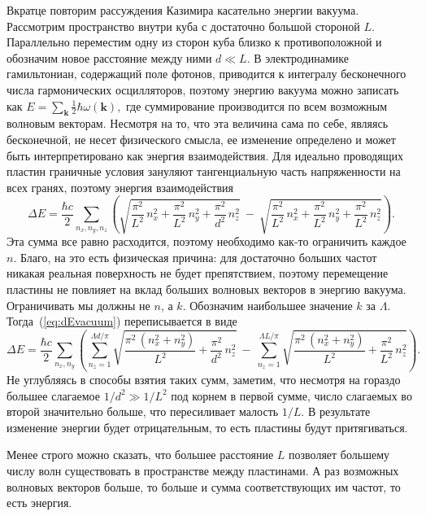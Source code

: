 \documentclass[a4paper, 12pt]{article}
\def\vec#1{\mathbf{#1}}
\begin{document}
Вкратце повторим рассуждения Казимира касательно энергии вакуума. Рассмотрим пространство внутри куба с достаточно большой стороной $L$. Параллельно переместим одну из сторон куба близко к противоположной и обозначим новое расстояние между ними $d\ll L$. 
В электродинамике гамильтониан, содержащий поле фотонов, приводится к интегралу бесконечного числа гармонических осцилляторов, поэтому энергию вакуума можно записать как 
$E = \sum\limits_\vec{k} \frac{1}{2} \hbar\omega(\vec{k}),$
где суммирование производится по всем возможным волновым векторам. Несмотря на то, что эта величина сама по себе, являясь бесконечной, не несет физического смысла, ее изменение определено и может быть интерпретировано как энергия взаимодействия. Для идеально проводящих пластин граничные условия зануляют тангенциальную часть напряженности на всех гранях, поэтому энергия взаимодействия
\begin{equation}
\Delta E = \frac{\hbar c}{2}\sum\limits_{n_x, n_y, n_z} \left(
\sqrt{\frac{\pi^2}{L^2}\,n_x^2 + \frac{\pi^2}{L^2}\,n_y^2 + \frac{\pi^2}{d^2}\,n_z^2} \ - \ 
\sqrt{\frac{\pi^2}{L^2}\,n_x^2 + \frac{\pi^2}{L^2}\,n_y^2 + \frac{\pi^2}{L^2}\,n_z^2}
\right).
\label{eq:dEvacuum}
\end{equation}
Эта сумма все равно расходится, поэтому необходимо как-то ограничить каждое~$n$. Благо, на это есть физическая причина: для достаточно больших частот никакая реальная поверхность не будет препятствием, поэтому перемещение пластины не повлияет на вклад больших волновых векторов в энергию вакуума. Ограничивать мы должны не $n$, а $k$. Обозначим наибольшее значение $k$ за $\Lambda$. Тогда~(\ref{eq:dEvacuum}) переписывается в виде 
\begin{equation}
\Delta E = \frac{\hbar c}{2}\sum\limits_{n_x, n_y}\left(
\sum\limits_{n_z=1}^{\Lambda d/\pi} \sqrt{\frac{\pi^2\,(n_x^2 + n_y^2)}{L^2} + \frac{\pi^2}{d^2}\,n_z^2} \ - \ 
\sum\limits_{n_z=1}^{\Lambda L/\pi} \sqrt{\frac{\pi^2\,(n_x^2 + n_y^2)}{L^2} + \frac{\pi^2}{L^2}\,n_z^2}
\right).
\label{eq:dEvac.trimmed}
\end{equation}
Не углубляясь в способы взятия таких сумм, заметим, что несмотря на гораздо большее слагаемое $1/d^2 \gg 1/L^2$ под корнем в первой сумме, число слагаемых во второй значительно больше, что пересиливает малость $1/L$. В результате изменение энергии будет отрицательным, то есть пластины будут притягиваться. 

Менее строго можно сказать, что большее расстояние $L$ позволяет большему числу волн существовать в пространстве между пластинами. А раз возможных волновых векторов больше, то больше и сумма соответствующих им частот, то есть энергия. 
\end{document}
